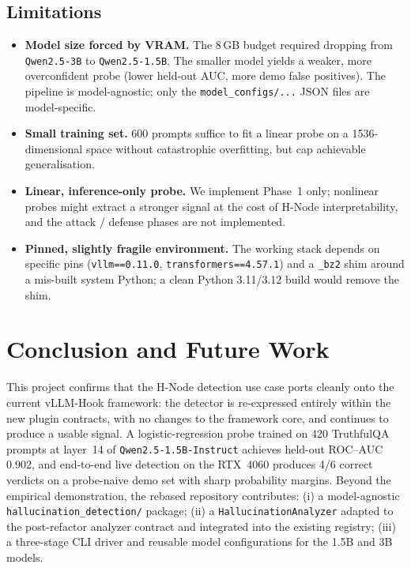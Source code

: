 \documentclass[11pt]{article}
\begin{document}
\subsection{Limitations}
\begin{itemize}
  \item \textbf{Model size forced by VRAM.} The 8\,GB budget required dropping from
  \texttt{Qwen2.5-3B} to \texttt{Qwen2.5-1.5B}. The smaller model yields a weaker, more
  overconfident probe (lower held-out AUC, more demo false positives). The pipeline is
  model-agnostic; only the \texttt{model\_configs/...} JSON files are model-specific.
  \item \textbf{Small training set.} 600 prompts suffice to fit a linear probe on a
  1536-dimensional space without catastrophic overfitting, but cap achievable generalisation.
  \item \textbf{Linear, inference-only probe.} We implement Phase~1 only; nonlinear probes
  might extract a stronger signal at the cost of H-Node interpretability, and the attack /
  defense phases are not implemented.
  \item \textbf{Pinned, slightly fragile environment.} The working stack depends on specific
  pins (\texttt{vllm==0.11.0}, \texttt{transformers==4.57.1}) and a \texttt{\_bz2} shim around
  a mis-built system Python; a clean Python 3.11/3.12 build would remove the shim.
\end{itemize}

\section{Conclusion and Future Work}

This project confirms that the H-Node detection use case ports cleanly onto the current
vLLM-Hook framework: the detector is re-expressed entirely within the new plugin contracts,
with no changes to the framework core, and continues to produce a usable signal. A
logistic-regression probe trained on 420 TruthfulQA prompts at layer~14 of
\texttt{Qwen2.5-1.5B-Instruct} achieves held-out ROC--AUC 0.902, and end-to-end live detection
on the RTX~4060 produces 4/6 correct verdicts on a probe-naive demo set with sharp probability
margins. Beyond the empirical demonstration, the rebased repository contributes: (i) a
model-agnostic \texttt{hallucination\_detection/} package; (ii) a \texttt{HallucinationAnalyzer}
adapted to the post-refactor analyzer contract and integrated into the existing registry;
(iii) a three-stage CLI driver and reusable model configurations for the 1.5B and 3B models.
\end{document}
